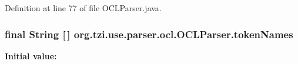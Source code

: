 Definition at line 77 of file O\-C\-L\-Parser.\-java.

\hypertarget{classorg_1_1tzi_1_1use_1_1parser_1_1ocl_1_1_o_c_l_parser_ac6af21aed16ba6abbb86685a2fa14265}{
\subsubsection[{token\-Names}]{\setlength{\rightskip}{0pt plus 5cm}final String \mbox{[}$\,$\mbox{]} org.\-tzi.\-use.\-parser.\-ocl.\-O\-C\-L\-Parser.\-token\-Names\hspace{0.3cm}{\ttfamily [static]}}}\label{classorg_1_1tzi_1_1use_1_1parser_1_1ocl_1_1_o_c_l_parser_ac6af21aed16ba6abbb86685a2fa14265}
{\bfseries Initial value\-:}
